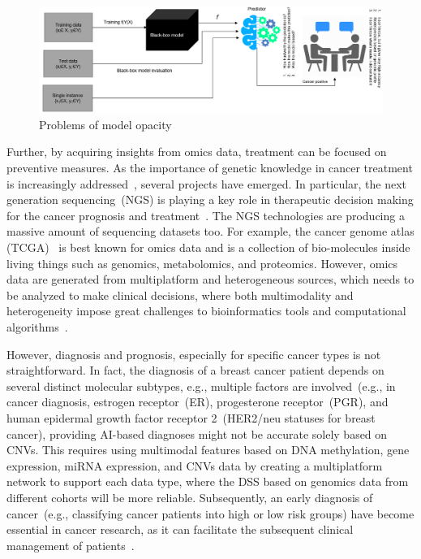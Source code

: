 \begin{figure}[h]
	\centering
	\includegraphics[width=0.9\linewidth]{images/bbm.png}
	\caption{Problems of model opacity}
    \label{fig:model_bbm}
    \vspace{-2mm}
\end{figure}

\hspace*{3.5mm} Further, by acquiring insights from omics data, treatment can be focused on preventive measures. As the importance of genetic knowledge in cancer treatment is increasingly addressed~\cite{15Wu}, several projects have emerged. In particular, the next generation sequencing~(NGS) is playing a key role in therapeutic decision making for the cancer prognosis and treatment~\cite{jha2017towards}. The NGS technologies are producing a massive amount of sequencing datasets too. For example, the cancer genome atlas (TCGA)~\cite{tomczak2015cancer} is best known for omics data and is a collection of bio-molecules inside living things such as genomics, metabolomics, and proteomics. However, omics data are generated from multiplatform and heterogeneous sources, which needs to be analyzed to make clinical decisions, where both multimodality and heterogeneity impose great challenges to bioinformatics tools and computational algorithms~\cite{karimACCESS2019,karimBIB2019}. 

\hspace*{3.5mm} However, diagnosis and prognosis, especially for specific cancer types is not straightforward. In fact, the diagnosis of a breast cancer patient depends on several distinct molecular subtypes, e.g., multiple factors are involved~(e.g., in cancer diagnosis, estrogen receptor~(ER), progesterone receptor~(PGR), and human epidermal growth factor receptor 2~(HER2/neu statuses for breast cancer), providing AI-based diagnoses might not be accurate solely based on CNVs. This requires using multimodal features based on DNA methylation, gene expression, miRNA expression, and CNVs data by creating a multiplatform network to support each data type, where the DSS based on genomics data from different cohorts will be more reliable. Subsequently, an early diagnosis of cancer~(e.g., classifying cancer patients into high or low risk groups) have become essential in cancer research, as it can facilitate the subsequent clinical management of patients~\cite{kourou2015machine}.  

